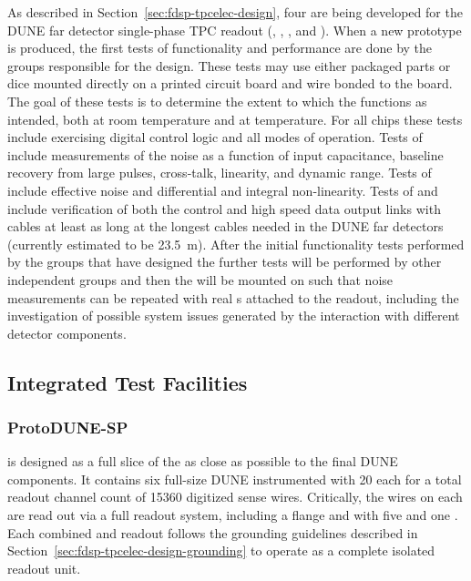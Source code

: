As described in Section~\ref{sec:fdsp-tpcelec-design}, four  
are being developed for the DUNE far detector single-phase TPC readout 
(, , , and ). 
When a new prototype  is produced, the first tests of 
 functionality and performance are done by the groups 
responsible for the  design. These tests may use either 
packaged parts or dice mounted directly on a printed circuit board 
and wire bonded to the board.  The goal of these tests is to determine 
the extent to which the  functions as intended, both at room 
temperature and at \lntwo temperature.  For all chips these tests 
include exercising digital control logic and all modes of operation. Tests 
of   include measurements of the noise as a function 
of input capacitance, baseline recovery from large pulses, cross-talk, linearity, 
and dynamic range. Tests of  include effective noise and 
differential and integral non-linearity. Tests of  and  
include verification of both the control and high speed data output links with 
cables at least as long at the longest cables needed in the DUNE far detectors 
(currently estimated to be \SI{23.5}{m}). After the initial functionality
tests performed by the groups that have designed the  further
tests will be performed by other independent groups and then the 
will be mounted on  such that noise measurements can be repeated
with real s attached to the readout, including the investigation
of possible system issues generated by the interaction with different 
detector components.

\subsection{Integrated Test Facilities}
\label{sec:fdsp-tpcelec-qa-facilities}

\subsubsection{ProtoDUNE-SP}
\label{sec:fdsp-tpcelec-qa-facilities-pdune}

 is designed as a full slice of the  as close as 
possible to the final DUNE \single components. It contains six full-size 
DUNE  instrumented with \num{20}  each for a 
total readout channel count of \num{15360} digitized sense wires. Critically, 
the wires on each  are read out via a full  readout 
system, including a  flange and  with five  
and one . Each combined  and  readout follows 
the grounding guidelines described in Section~\ref{sec:fdsp-tpcelec-design-grounding} 
to operate as a complete isolated readout unit.

